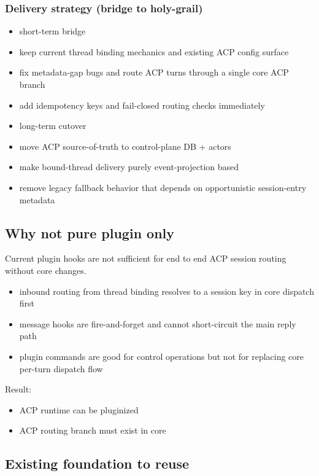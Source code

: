 \subsubsection{Delivery strategy (bridge to holy-grail)}


\begin{itemize}
  \item short-term bridge
  \item keep current thread binding mechanics and existing ACP config surface
  \item fix metadata-gap bugs and route ACP turns through a single core ACP branch
  \item add idempotency keys and fail-closed routing checks immediately
  \item long-term cutover
  \item move ACP source-of-truth to control-plane DB + actors
  \item make bound-thread delivery purely event-projection based
  \item remove legacy fallback behavior that depends on opportunistic session-entry metadata
\end{itemize}


\subsection{Why not pure plugin only}


Current plugin hooks are not sufficient for end to end ACP session routing without core changes.

\begin{itemize}
  \item inbound routing from thread binding resolves to a session key in core dispatch first
  \item message hooks are fire-and-forget and cannot short-circuit the main reply path
  \item plugin commands are good for control operations but not for replacing core per-turn dispatch flow
\end{itemize}


Result:

\begin{itemize}
  \item ACP runtime can be pluginized
  \item ACP routing branch must exist in core
\end{itemize}


\subsection{Existing foundation to reuse}


